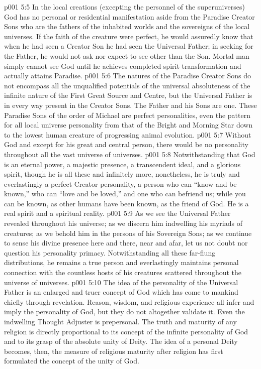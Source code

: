 \vs p001 5:5 \pc In the local creations (excepting the personnel of the superuniverses) God has no personal or residential manifestation aside from the Paradise Creator Sons who are the fathers of the inhabited worlds and the sovereigns of the local universes. If the faith of the creature were perfect, he would assuredly know that when he had seen a Creator Son he had seen the Universal Father; in seeking for the Father, he would not ask nor expect to see other than the Son. Mortal man simply cannot see God until he achieves completed spirit transformation and actually attains Paradise.
\vs p001 5:6 The natures of the Paradise Creator Sons do not encompass all the unqualified potentials of the universal absoluteness of the infinite nature of the First Great Source and Centre, but the Universal Father is in every way  present in the Creator Sons. The Father and his Sons are one. These Paradise Sons of the order of Michael are perfect personalities, even the pattern for all local universe personality from that of the Bright and Morning Star down to the lowest human creature of progressing animal evolution.
\vs p001 5:7 \pc Without God and except for his great and central person, there would be no personality throughout all the vast universe of universes. 
\vs p001 5:8 \pc Notwithstanding that God is an eternal power, a majestic presence, a transcendent ideal, and a glorious spirit, though he is all these and infinitely more, nonetheless, he is truly and everlastingly a perfect Creator personality, a person who can “know and be known,” who can “love and be loved,” and one who can befriend us; while you can be known, as other humans have been known, as the friend of God. He is a real spirit and a spiritual reality.
\vs p001 5:9 As we see the Universal Father revealed throughout his universe; as we discern him indwelling his myriads of creatures; as we behold him in the persons of his Sovereign Sons; as we continue to sense his divine presence here and there, near and afar, let us not doubt nor question his personality primacy. Notwithstanding all these far\hyp{}flung distributions, he remains a true person and everlastingly maintains personal connection with the countless hosts of his creatures scattered throughout the universe of universes.
\vs p001 5:10 \pc The idea of the personality of the Universal Father is an enlarged and truer concept of God which has come to mankind chiefly through revelation. Reason, wisdom, and religious experience all infer and imply the personality of God, but they do not altogether validate it. Even the indwelling Thought Adjuster is prepersonal. The truth and maturity of any religion is directly proportional to its concept of the infinite personality of God and to its grasp of the absolute unity of Deity. The idea of a personal Deity becomes, then, the measure of religious maturity after religion has first formulated the concept of the unity of God.
